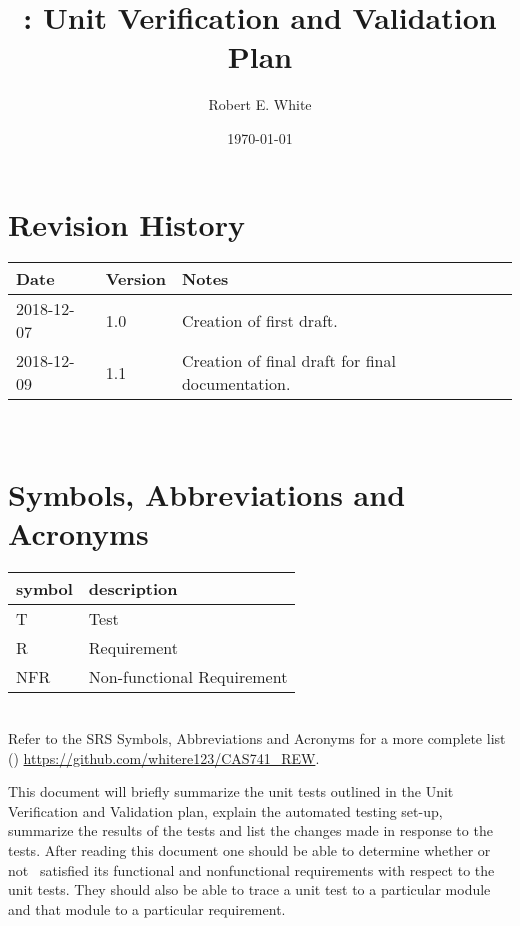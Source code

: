 \documentclass[12pt, titlepage]{article}
\begin{document}
\title{\progname: Unit Verification and Validation Plan} 
\author{Robert E. White}
\date{\today}
	
\maketitle


\section{Revision History}

\begin{tabularx}{\textwidth}{p{3cm}p{2cm}X}
\toprule {\bf Date} & {\bf Version} & {\bf Notes}\\
\midrule
2018-12-07 & 1.0 & Creation of first draft.\\
2018-12-09 & 1.1 & Creation of final draft for final documentation. \\
\bottomrule
\end{tabularx}

~\newpage

\section{Symbols, Abbreviations and Acronyms}

\renewcommand{\arraystretch}{1.2}
\begin{tabular}{l l} 
	\toprule		
	\textbf{symbol} & \textbf{description}\\
	\midrule 
	T & Test\\
	R & Requirement\\ 
	NFR & Non-functional Requirement\\
	\bottomrule
\end{tabular}\\

Refer to the SRS Symbols, Abbreviations and Acronyms for a more 
complete list (\cite{SRS}) \url{https://github.com/whitere123/CAS741_REW}. 

\newpage

\tableofcontents

\listoftables %

\listoffigures %

\newpage


This document will briefly summarize the unit tests outlined in the Unit 
Verification and Validation plan, explain the automated testing set-up, 
summarize the results of the tests and list the changes made in response to the 
tests. After reading this document one should be able to determine whether or 
not \progname \ satisfied its functional and nonfunctional requirements with 
respect to the unit tests. They should also be able to trace a unit test to a 
particular module and that module to a particular requirement. 
\end{document}
